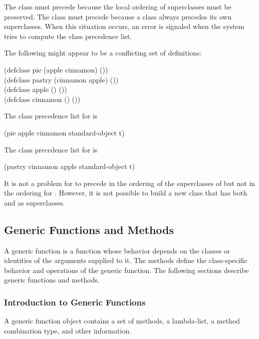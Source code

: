 The class  must precede  because the local
ordering of superclasses must be preserved.  The class  must
precede  because a class always precedes its own
superclasses.  When this situation occurs, an error is signaled when
the system tries to compute the class precedence list.

The following might appear to be a conflicting set of definitions:

\begin{lisp}
(defclass pie (apple cinnamon) ()) \\
(defclass pastry (cinnamon apple) ()) \\
(defclass apple () ()) \\
(defclass cinnamon () ())
\end{lisp}

The class precedence list for  is
\begin{lisp}
(pie apple cinnamon standard-object t)
\end{lisp}

The class precedence list for  is
\begin{lisp}
(pastry cinnamon apple standard-object t)
\end{lisp}

It is not a problem for  to precede  in the
ordering of the superclasses of  but not in the ordering for
.  However, it is not possible to build a new class that
has both  and  as superclasses.


\subsection{Generic Functions and Methods}

A {\bit generic function\/} is a function whose behavior depends on
the classes or identities of the arguments supplied to it.  The {\bit
methods} define the class-specific behavior and operations of the
generic function. The following sections describe generic functions
and methods.

\subsubsection{Introduction to Generic Functions}

A generic function object contains a set of methods, a
lambda-list, a method combination type, and other information.

